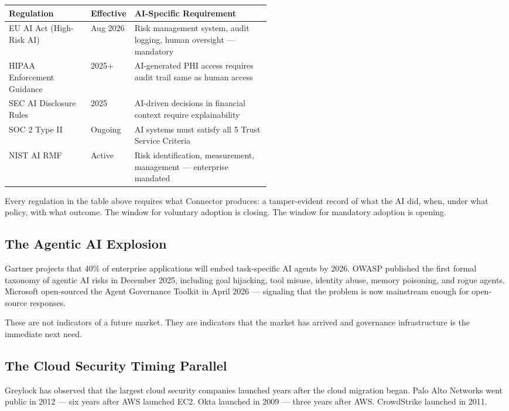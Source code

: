 \documentclass[11pt,a4paper]{article}
\begin{document}
\begin{center}
\small
\begin{tabular}{@{}llp{0.52\linewidth}@{}}
\toprule
\textbf{Regulation} & \textbf{Effective} & \textbf{AI-Specific Requirement} \\
\midrule
EU AI Act (High-Risk AI) & Aug 2026 & Risk management system, audit logging, human oversight — mandatory \\
HIPAA Enforcement Guidance & 2025+ & AI-generated PHI access requires audit trail same as human access \\
SEC AI Disclosure Rules & 2025 & AI-driven decisions in financial context require explainability \\
SOC 2 Type II & Ongoing & AI systems must satisfy all 5 Trust Service Criteria \\
NIST AI RMF & Active & Risk identification, measurement, management — enterprise mandated \\
\bottomrule
\end{tabular}
\end{center}

Every regulation in the table above requires what Connector produces: a tamper-evident record of
what the AI did, when, under what policy, with what outcome. The window for voluntary adoption
is closing. The window for mandatory adoption is opening.

\subsection{The Agentic AI Explosion}

Gartner projects that 40\% of enterprise applications will embed task-specific AI agents by 2026.
OWASP published the first formal taxonomy of agentic AI risks in December 2025, including
goal hijacking, tool misuse, identity abuse, memory poisoning, and rogue agents.
Microsoft open-sourced the Agent Governance Toolkit in April 2026 — signaling that the problem
is now mainstream enough for open-source responses.

These are not indicators of a future market. They are indicators that the market has arrived
and governance infrastructure is the immediate next need.

\subsection{The Cloud Security Timing Parallel}

Greylock has observed that the largest cloud security companies launched years after the cloud
migration began. Palo Alto Networks went public in 2012 — six years after AWS launched EC2.
Okta launched in 2009 — three years after AWS. CrowdStrike launched in 2011.
\end{document}

